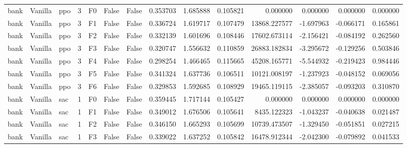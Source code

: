 \begin{tabular}{lllrlllrrrrrrr}
      bank & Vanilla &       ppo &     3 &  F0 &           False &            False &  0.353703 &  1.685888 & 0.105821 &         0.000000 &           0.000000 &        0.000000 &            0.000000 \\
      bank & Vanilla &       ppo &     3 &  F1 &           False &            False &  0.336724 &  1.619717 & 0.107479 &     13868.227577 &          -1.697963 &       -0.066171 &            0.165861 \\
      bank & Vanilla &       ppo &     3 &  F2 &           False &            False &  0.332139 &  1.601696 & 0.108446 &     17602.673114 &          -2.156421 &       -0.084192 &            0.262560 \\
      bank & Vanilla &       ppo &     3 &  F3 &           False &            False &  0.320747 &  1.556632 & 0.110859 &     26883.182834 &          -3.295672 &       -0.129256 &            0.503846 \\
      bank & Vanilla &       ppo &     3 &  F4 &           False &            False &  0.298254 &  1.466465 & 0.115665 &     45208.165771 &          -5.544932 &       -0.219423 &            0.984446 \\
      bank & Vanilla &       ppo &     3 &  F5 &           False &            False &  0.341324 &  1.637736 & 0.106511 &     10121.008197 &          -1.237923 &       -0.048152 &            0.069056 \\
      bank & Vanilla &       ppo &     3 &  F6 &           False &            False &  0.329853 &  1.592685 & 0.108929 &     19465.119115 &          -2.385057 &       -0.093203 &            0.310870 \\
      bank & Vanilla &       sac &     1 &  F0 &           False &            False &  0.359445 &  1.717144 & 0.105427 &         0.000000 &           0.000000 &        0.000000 &            0.000000 \\
      bank & Vanilla &       sac &     1 &  F1 &           False &            False &  0.349012 &  1.676506 & 0.105641 &      8435.122323 &          -1.043237 &       -0.040638 &            0.021487 \\
      bank & Vanilla &       sac &     1 &  F2 &           False &            False &  0.346150 &  1.665293 & 0.105699 &     10739.473507 &          -1.329450 &       -0.051851 &            0.027215 \\
      bank & Vanilla &       sac &     1 &  F3 &           False &            False &  0.339022 &  1.637252 & 0.105842 &     16478.912344 &          -2.042300 &       -0.079892 &            0.041533 \\

\end{tabular}
